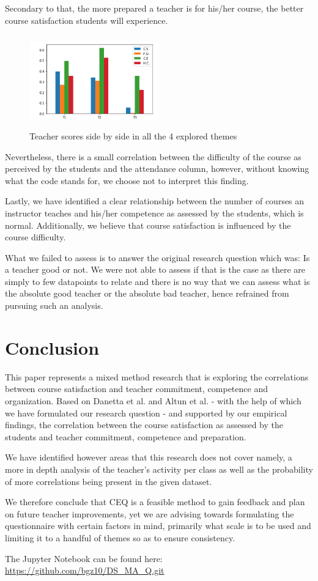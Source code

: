\documentclass[twocolumn]{article}
\begin{document}
Secondary to that, the more prepared a teacher is for his/her course, the better course satisfaction students will experience.

\begin{figure}
  \includegraphics[width=0.5\textwidth,height=4cm]{tt.png}
  \caption{Teacher scores side by side in all the 4 explored themes}
  \label{fig4}
\end{figure}

Nevertheless, there is a small correlation between the difficulty of the course as perceived by the students and the attendance column, however, without knowing what the code stands for, we choose not to interpret this finding.

Lastly, we have identified a clear relationship between the number of courses an instructor teaches and his/her competence as assessed by the students, which is normal. Additionally, we believe that course satisfaction is influenced by the course difficulty.

What we failed to assess is to answer the original research question which was: Is a teacher good or not. We were not able to assess if that is the case as there are simply to few datapoints to relate and there is no way that we can assess what is the absolute good teacher or the absolute bad teacher, hence refrained from pursuing such an analysis.

\section{Conclusion} \label{conclusion}
This paper represents a mixed method research that is exploring the correlations between course satisfaction and teacher commitment, competence and organization. Based on Danetta et al. \cite{Dannetta2002} and Altun et al. \cite{Altun2017}- with the help of which we have formulated our research question - and supported by our empirical findings, the correlation between the course satisfaction as assessed by the students and teacher commitment, competence and preparation.

We have identified however areas that this research does not cover namely, a more in depth analysis of the teacher’s activity per class as well as the probability of more correlations being present in the given dataset.

We therefore conclude that CEQ is a feasible method to gain feedback and plan on future teacher improvements, yet we are advising towards formulating the questionnaire with certain factors in mind, primarily what scale is to be used and limiting it to a handful of themes so as to ensure consistency.

The Jupyter Notebook can be found here:  \url{https://github.com/bgz10/DS_MA_Q.git} 



\end{document}
